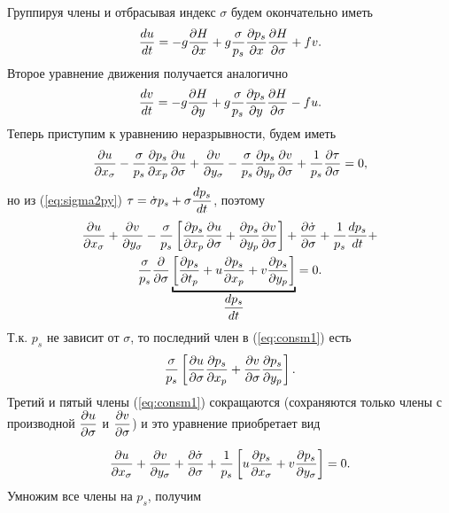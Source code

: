 Группируя члены и отбрасывая индекс $\sigma$ будем окончательно иметь
\begin{equation}
    \label{eq:dudt_sigma}
    \displaystyle\frac{d u}{d t} = -g\displaystyle\frac{\partial H}{\partial x}+g\frac{\sigma}{p_s}\displaystyle\frac{\partial p_s}{\partial x}\displaystyle\frac{\partial H}{\partial \sigma}+fv.
\end{equation}
Второе уравнение движения получается аналогично
\begin{equation}
    \label{eq:dvdt_sigma}
    \displaystyle\frac{d v}{d t} = -g\displaystyle\frac{\partial H}{\partial y}+g\frac{\sigma}{p_s}\displaystyle\frac{\partial p_s}{\partial y}\displaystyle\frac{\partial H}{\partial \sigma}-fu.
\end{equation}
Теперь приступим к уравнению неразрывности, будем иметь
\begin{equation*}
    \displaystyle\frac{\partial u}{\partial x_{\sigma}}-\frac{\sigma}{p_s}\displaystyle\frac{\partial p_s}{\partial x_p}\displaystyle\frac{\partial u}{\partial \sigma}+\displaystyle\frac{\partial v}{\partial y_{\sigma}}-\frac{\sigma}{p_s}\displaystyle\frac{\partial p_s}{\partial y_p}\displaystyle\frac{\partial v}{\partial \sigma}+\frac{1}{p_s}\displaystyle\frac{\partial \tau}{\partial \sigma}=0,
\end{equation*}
но из (\ref{eq:sigma2py}) $\tau=\dot{\sigma}p_s+\sigma\displaystyle\frac{d p_s}{d t}$, поэтому
\begin{multline}
    \label{eq:consm1}
    \pd{u}{x_{\sigma}}+\pd{v}{y_{\sigma}}-
    \frac{\sigma}{p_s} \left[ \pd{p_s}{x_p} \pd{u}{\sigma}+\pd{p_s}{y_p}\pd{v}{\sigma}  \right] + \pd{\dot{\sigma}}{\sigma}+\frac{1}{p_s}\td{p_s}{t}+\\
    \frac{\sigma}{p_s}\pd{}{\sigma} \underbracket{\left[ \pd{p_s}{t_p} + u\pd{p_s}{x_p}+v\pd{p_s}{y_p} \right]}_{\td{p_s}{t}} = 0.
\end{multline}
Т.к. $p_s$ не зависит от $\sigma$, то последний член в (\ref{eq:consm1}) есть 
\begin{equation*}
    \frac{\sigma}{p_s} \left[ \displaystyle\frac{\partial u}{\partial \sigma}\displaystyle\frac{\partial p_s}{\partial x_p} + \displaystyle\frac{\partial v}{\partial \sigma}\displaystyle\frac{\partial p_s}{\partial y_p}  \right].
\end{equation*}
Третий и пятый члены (\ref{eq:consm1}) сокращаются (сохраняются только члены с производной $\displaystyle\frac{\partial u}{\partial \sigma}$ и $ \displaystyle\frac{\partial v}{\partial \sigma}$) и это уравнение приобретает вид

\begin{equation*}
    \displaystyle\frac{\partial u}{\partial x_{\sigma}} + \displaystyle\frac{\partial v}{\partial y_{\sigma}} + \displaystyle\frac{\partial  \dot{\sigma} }{\partial \sigma} + \frac{1}{p_s} \left[ u\displaystyle\frac{\partial p_s}{\partial x_{\sigma}} + v\displaystyle\frac{\partial p_s}{\partial y_{\sigma}} \right] = 0.
\end{equation*}
Умножим все члены на $p_s$, получим

